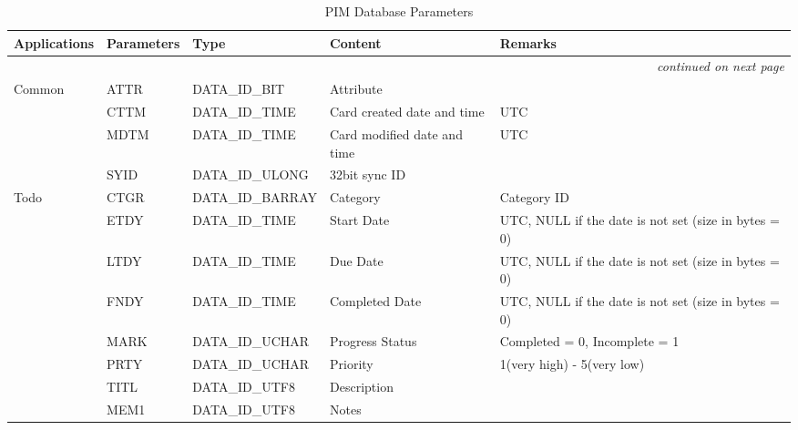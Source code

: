\small
\setlongtables
    \begin{longtable}[c]{|l|l|l|p{3cm}|p{5cm}|}
      \caption{PIM Database Parameters} \label{paramtable} \\
      \hline
      Applications & Parameters & Type & Content & Remarks \\
      \hline
      \endhead
      \hline
      \multicolumn{5}{|r|}{\small\slshape continued on next page} \\
      \hline
      \endfoot
      \hline
      \endlastfoot
        \hline
        Common & ATTR & DATA\_ID\_BIT & Attribute & \\
        & CTTM & DATA\_ID\_TIME & Card created date and time & UTC \\
        & MDTM & DATA\_ID\_TIME & Card modified date and time & UTC \\
        & SYID & DATA\_ID\_ULONG & 32bit sync ID & \\
        \hline

        Todo & CTGR & DATA\_ID\_BARRAY & Category & Category ID \\
        & ETDY & DATA\_ID\_TIME & Start Date & UTC, NULL if the date is not
        set (size in bytes = 0) \\
        & LTDY & DATA\_ID\_TIME & Due Date & UTC, NULL if the date is not set
        (size in bytes = 0) \\ 
        & FNDY & DATA\_ID\_TIME & Completed Date & UTC, NULL if the date is
        not set (size in bytes = 0) \\
        & MARK & DATA\_ID\_UCHAR & Progress Status & Completed = 0, Incomplete
        = 1 \\
        & PRTY & DATA\_ID\_UCHAR & Priority & 1(very high) - 5(very low) \\
        & TITL & DATA\_ID\_UTF8 & Description & \\
        & MEM1 & DATA\_ID\_UTF8 & Notes & \\
        \hline


\end{longtable}
